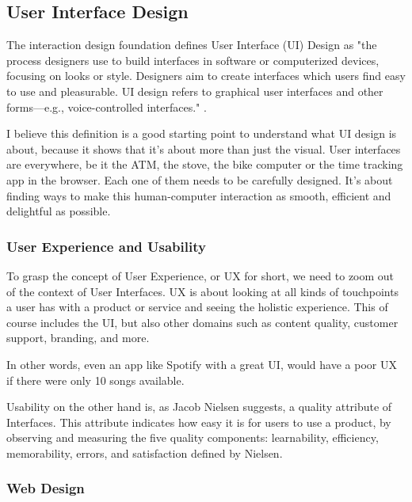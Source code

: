 \newpage
\subsection{User Interface Design}
The interaction design foundation defines User Interface (UI) Design as "the process designers use
to build interfaces in software or computerized devices, focusing on looks or style. Designers aim
to create interfaces which users find easy to use and pleasurable. UI design refers to graphical
user interfaces and other forms—e.g., voice-controlled interfaces."
.

I believe this definition is a good starting point to understand what UI design is about, because it
shows that it's about more than just the visual. User interfaces are everywhere, be it the ATM, the
stove, the bike computer or the time tracking app in the browser. Each one of them needs to be
carefully designed. It's about finding ways to make this human-computer interaction as smooth,
efficient and delightful as possible.


\subsubsection{User Experience and Usability}
To grasp the concept of User Experience, or UX for short, we need to zoom out of the context of User
Interfaces. UX is about looking at all kinds of touchpoints a user has with a product or service and
seeing the holistic experience. This of course includes the UI, but also other domains such as
content quality, customer support, branding, and more. 

In other words, even an app like Spotify with a great UI, would have a poor UX if there were only 10
songs available.

Usability on the other hand is, as Jacob Nielsen suggests, a quality attribute of Interfaces. This
attribute indicates how easy it is for users to use a product, by observing and measuring the five
quality components: learnability, efficiency, memorability, errors, and satisfaction
defined by Nielsen. 

\subsubsection{Web Design}

